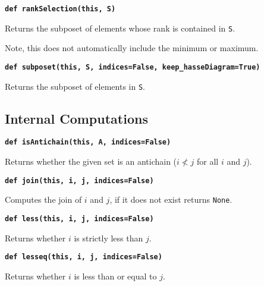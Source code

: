 \documentclass[12pt]{article}
\begin{document}
\begin{child}
{{}\endlist}

\textbf{\hypertarget{Poset.rankSelection}{\texttt{def rankSelection(this, S)}}}
{\list{}{\leftmargin 0.5cm}\item{
Returns the subposet of elements whose rank is contained in \verb|S|.

Note, this does not automatically include the minimum or maximum.


}\endlist}

\textbf{\hypertarget{Poset.subposet}{\texttt{def subposet(this, S, indices=False, keep\_hasseDiagram=True)}}}
{\list{}{\leftmargin 0.5cm}\item{
Returns the subposet of elements in \verb|S|.


}\endlist}

\subsection{Internal Computations}
\label{Internal Computations}

\textbf{\hypertarget{Poset.isAntichain}{\texttt{def isAntichain(this, A, indices=False)}}}
{\list{}{\leftmargin 0.5cm}\item{
Returns whether the given set is an antichain ($i\not<j$ for all $i$ and $j$).


}\endlist}

\textbf{\hypertarget{Poset.join}{\texttt{def join(this, i, j, indices=False)}}}
{\list{}{\leftmargin 0.5cm}\item{
Computes the join of $i$ and $j$, if it does not exist returns \verb|None|.


}\endlist}

\textbf{\hypertarget{Poset.less}{\texttt{def less(this, i, j, indices=False)}}}
{\list{}{\leftmargin 0.5cm}\item{
Returns whether $i$ is strictly less than $j$.


}\endlist}

\textbf{\hypertarget{Poset.lesseq}{\texttt{def lesseq(this, i, j, indices=False)}}}
{\list{}{\leftmargin 0.5cm}\item{
Returns whether $i$ is less than or equal to $j$.


}}
\end{child}
\end{document}
